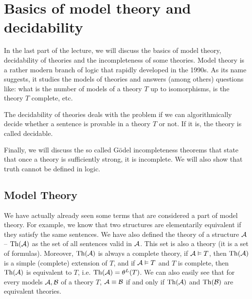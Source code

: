 
\chapter{Basics of model theory and decidability}

In the last part of the lecture, we will discuss the basics of model theory, decidability of theories and the incompleteness of some theories. Model theory is a rather modern branch of logic that rapidly developed in the 1990s. As its name suggests, it studies the models of theories and answers (among others) questions like: what is the number of models of a theory $T$ up to isomorphisms, is the theory $T$ complete, etc.

The decidability of theories deals with the problem if we can algorithmically decide whether a sentence is provable in a theory $T$ or not. If it is, the theory is called decidable. 

Finally, we will discuss the so called Gödel incompleteness theorems that state that once a theory is sufficiently strong, it is incomplete. We will also show that truth cannot be defined in logic.

\section{Model Theory}

We have actually already seen some terms that are considered a part of model theory. For example, we know that two structures are elementarily equivalent if they satisfy the same sentences. We have also defined the theory of a structure $\mathcal{A}$ -- $\operatorname{Th}(\mathcal{A})$ as the set of all sentences valid in $\mathcal{A}$. This set is also a theory (it is a set of formulas). Moreover, $\operatorname{Th}(\mathcal{A})$ is always a complete theory, if $\mathcal{A} \vDash T$, then $\operatorname{Th}(\mathcal{A})$ is a simple (complete) extension of $T$, and if $\mathcal{A} \vDash T$ and $T$ is complete, then $\operatorname{Th}(\mathcal{A})$ is equivalent to $T$, i.e. $\operatorname{Th}(\mathcal{A}) = \theta^L(T)$. We can also easily see that for every models $\mathcal{A}, \mathcal{B}$ of a theory $T$, $\mathcal{A} \equiv \mathcal{B}$ if and only if $\operatorname{Th}(\mathcal{A})$ and $\operatorname{Th}(\mathcal{B})$ are equivalent theories.

